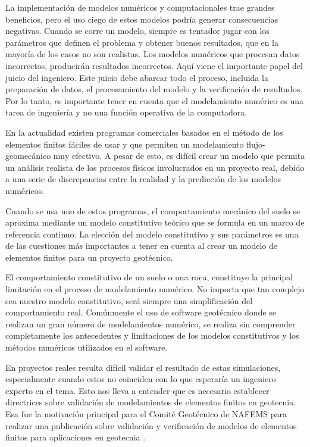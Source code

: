 La implementación de modelos numéricos y computacionales trae grandes beneficios, pero el uso ciego de estos modelos podría generar consecuencias negativas. Cuando se corre un modelo, siempre es tentador jugar con los parámetros que definen el problema y obtener buenos resultados, que en la mayoría de los casos no son realistas. Los modelos numéricos que procesan datos incorrectos, producirán resultados incorrectos. Aquí viene el importante papel del juicio del ingeniero. Este juicio debe abarcar todo el proceso, incluida la preparación de datos, el procesamiento del modelo y la verificación de resultados. Por lo tanto, es importante tener en cuenta que el modelamiento numérico es una tarea de ingeniería y no una función operativa de la computadora.\bigskip

En la actualidad existen programas comerciales basados en el método de los elementos finitos fáciles de usar y que permiten un modelamiento flujo-geomecánico muy efectivo. A pesar de esto, es difícil crear un modelo que permita un análisis realista de los procesos físicos involucrados en un proyecto real, debido a una serie de discrepancias entre la realidad y la predicción de los modelos numéricos.\bigskip

Cuando se usa uno de estos programas, el comportamiento mecánico del suelo se aproxima mediante un modelo constitutivo teórico que se formula en un marco de referencia continuo. La elección del modelo constitutivo y sus parámetros es una de las cuestiones más importantes a tener en cuenta al crear un modelo de elementos finitos para un proyecto geotécnico.\bigskip

El comportamiento constitutivo de un suelo o una roca, constituye la principal limitación en el proceso de modelamiento numérico. No importa que tan complejo sea nuestro modelo constitutivo, será siempre una simplificación del comportamiento real. Comúnmente el uso de software geotécnico donde se realizan un gran número de modelamientos numérico, se realiza sin comprender completamente los antecedentes y limitaciones de los modelos constitutivos y los métodos numéricos utilizados en el software.\bigskip

En proyectos reales resulta difícil validar el resultado de estas simulaciones, especialmente cuando estos no coinciden con lo que esperaría un ingeniero experto en el tema. Esto nos lleva a entender que es necesario establecer directrices sobre validación de modelamientos de elementos finitos en geotecnia. Esa fue la motivación principal para el Comité Geotécnico de NAFEMS para realizar una publicación sobre validación y verificación de modelos de elementos finitos para aplicaciones en geotecnia \cite{R.B.J.2013ValidationAnalysis}.\bigskip

